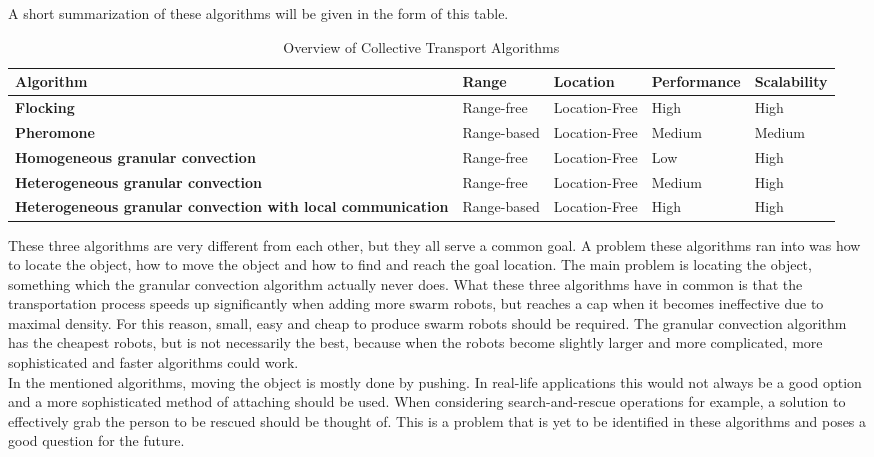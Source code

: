 A short summarization of these algorithms will be given in the form of this table. 

  \begin{table}[H]
  \renewcommand{\arraystretch}{1.3}
  \caption{Overview of Collective Transport Algorithms}
  \label{table_alg_coltrans2}
  \centering
  \begin{tabular}{|p{3cm}|l|l|l|l|}
    \hline
    \bfseries Algorithm & \bfseries Range & Location & \bfseries Performance & \bfseries Scalability\\
    \hline
    \bfseries Flocking & Range-free & Location-Free & High & High\\\hline
    \bfseries Pheromone & Range-based & Location-Free & Medium & Medium\\\hline
    \bfseries Homogeneous granular convection & Range-free& Location-Free & Low  & High\\\hline
    \bfseries Heterogeneous granular convection & Range-free& Location-Free & Medium & High\\\hline
    \bfseries Heterogeneous granular convection with local communication & Range-based& Location-Free & High & High\\\hline

    \end{tabular}
  \end{table}

These three algorithms are very different from each other, but they all serve a common goal. A problem these algorithms ran into was how to locate the object, how to move the object and how to find and reach the goal location. The main problem is locating the object, something which the granular convection algorithm actually never does.  What these three algorithms have in common is that the transportation process speeds up significantly when adding more swarm robots, but reaches a cap when it becomes ineffective due to maximal density. For this reason, small, easy and cheap to produce swarm robots should be required. The granular convection algorithm has the cheapest robots, but is not necessarily the best, because when the robots become slightly larger and more complicated, more sophisticated and faster algorithms could work. \\

In the mentioned algorithms, moving the object is mostly done by pushing. In real-life applications this would not always be a good option and a more sophisticated method of attaching should be used. When considering search-and-rescue operations for example, a solution to effectively grab the person to be rescued should be thought of. This is a problem that is yet to be identified in these algorithms and poses a good question for the future.


